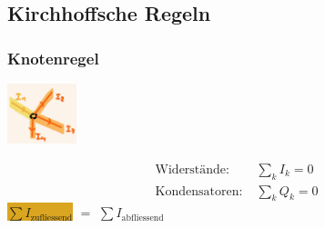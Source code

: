 \subsection{Kirchhoffsche Regeln}
    \subsubsection{Knotenregel}
        \vspace{-1mm}
        \begin{minipage}{0.49\linewidth}
            \begin{footnotesize}
                \begin{center}
                    \vspace{2mm}
                    \includegraphics[width = 20mm]{src/images/knotenregel.png}
                \end{center}
            \end{footnotesize}
        \end{minipage}
        \begin{minipage}{0.5\linewidth}
            \begin{scriptsize}
                \begin{center}
                    \begin{align*}
                        \text{Widerstände:} \; &\sum\limits_k I_k = 0\\
                        \text{Kondensatoren:} \; &\sum\limits_k Q_k = 0
                    \end{align*}
                    \colorbox{Goldenrod}{$\sum I_\text{zufliessend}$} $=$ \colorbox{Apricot}{$\sum I_\text{abfliessend}$} 
                \end{center}
            \end{scriptsize}
        \end{minipage}
        \vspace{1mm}
        \columnbreak

